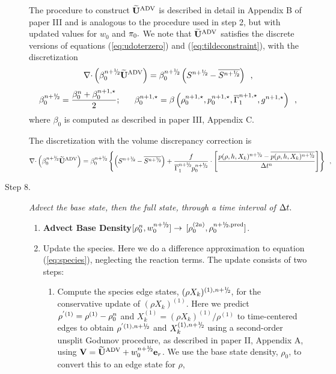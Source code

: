 \begin{description}
The procedure to construct $\widetilde{\mathbf{U}}^{\mathrm{ADV}}$ is described in detail in Appendix B of paper III
and is analogous to the procedure used in step 2, but with updated values
for $w_0$ and $\pi_0.$  We note that $\widetilde{\mathbf{U}}^{\mathrm{ADV}}$ satisfies the discrete versions of 
equations (\ref{eq:udoterzero}) and (\ref{eq:tildeconstraint}), with the discretization
\begin{equation}
\nablab \cdotb \left(\beta_0^{\nph} \uadvtwo\right) =
\beta_0^{\nph}\left(S^{\nph} - \overline{S^{\nph}}\right) \enskip ,
\end{equation}
\begin{equation}
\beta_0^{\nph} = \frac{ \beta_0^n +  \beta_0^{n+1,\star} }{2}; ~~~~~
 \beta_0^{n+1,\star} = \beta \left(\rho_0^{n+1,\star}, p_0^{n+1,\star}, \gammabar^{n+1,\star}, g^{n+1,\star}\right) \enskip ,
\end{equation}
where $\beta_0$ is computed as described in paper III, Appendix C.

The discretization with the volume discrepancy correction is
\begin{equation}
\nablab \cdotb \left(\beta_0^{\nph} \uadvtwo\right) =
\beta_0^{\nph}\left\{\left(S^{\nph} - \overline{S^{\nph}}\right)
 + \frac{f}{\gammabar^{\nph} p_0^{\nph}}\cdot 
\left[\frac{p(\rho,h,X_k)^{\nph} - \overline{p(\rho,h,X_k)^{\nph}}}{\Delta t^n}\right]\right\} \enskip ,
\end{equation}

\item[Step 8.] {\em Advect the base state, then the full state, through a time interval of $\Delta t.$}

\begin{enumerate}
\renewcommand{\theenumi}{{\bf \alph{enumi}}}

\item {\bf Advect Base Density}$[\rho_0^{n},w_0^{\nph}] \rightarrow$ 
$[\rho_0^{(2a)}, \rho_0^{\nph,{\rm pred}}]$.

\item Update the species.  Here we do a difference approximation to
  equation (\ref{eq:species}), neglecting the reaction terms.  The
  update consists of two steps:

  \begin{enumerate}
  \renewcommand{\labelenumii}{{\bf \roman{enumii}}.}

  \item Compute the species edge states, $(\rho X_k)^{(1),\nph}$, for
    the conservative update of $(\rho X_k)^{(1)}$.  Here we predict 
    $\rho^{'(1)} = \rho^{(1)} - \rho_0^n$
    and $X_k^{(1)} = (\rho X_k)^{(1)} / \rho^{(1)}$ to time-centered edges to 
    obtain $\rho^{'(1),\nph}$ and $X_k^{(1),\nph}$ using a second-order 
    unsplit Godunov procedure, as described in paper II, Appendix A, 
    using $\Vb = \uadvtwo+w_0^{\nph} \er$.  We use the base
    state density, $\rho_0$, to convert this to an edge state for $\rho$,


\end{enumerate}
\end{enumerate}
\end{description}
